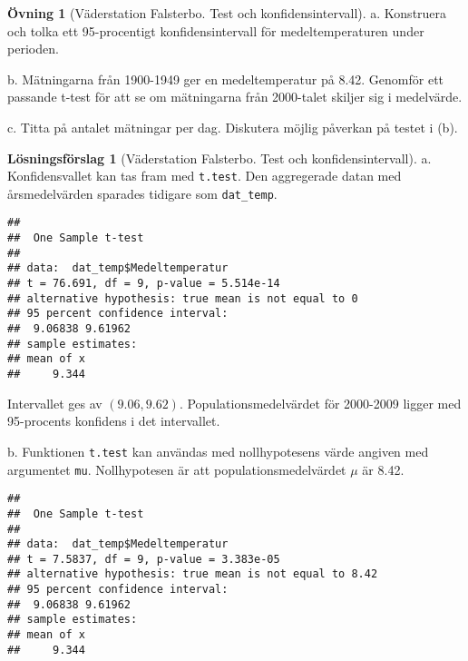 \documentclass[
]{book}
\newenvironment{Shaded}{\begin{snugshade}}{\end{snugshade}}
\newcommand{\AttributeTok}[1]{\textcolor[rgb]{0.77,0.63,0.00}{#1}}
\newcommand{\FloatTok}[1]{\textcolor[rgb]{0.00,0.00,0.81}{#1}}
\newcommand{\FunctionTok}[1]{\textcolor[rgb]{0.00,0.00,0.00}{#1}}
\newcommand{\NormalTok}[1]{#1}
\newcommand{\SpecialCharTok}[1]{\textcolor[rgb]{0.00,0.00,0.00}{#1}}
\theoremstyle{definition}
\theoremstyle{definition}
\theoremstyle{definition}
\newtheorem{exercise}{Övning}[chapter]
\theoremstyle{definition}
\newtheorem{hypothesis}{Lösningsförslag}[chapter]
\theoremstyle{remark}
\begin{document}
\begin{exercise}[Väderstation Falsterbo. Test och konfidensintervall]
a. Konstruera och tolka ett 95-procentigt konfidensintervall för medeltemperaturen under perioden.

b. Mätningarna från 1900-1949 ger en medeltemperatur på 8.42. Genomför ett passande t-test för att se om mätningarna från 2000-talet skiljer sig i medelvärde.

c. Titta på antalet mätningar per dag. Diskutera möjlig påverkan på testet i (b).
\end{exercise}

\begin{hypothesis}[Väderstation Falsterbo. Test och konfidensintervall]
a. Konfidensvallet kan tas fram med \texttt{t.test}. Den aggregerade datan med årsmedelvärden sparades tidigare som \texttt{dat\_temp}.

\begin{Shaded}
\end{Shaded}

\begin{verbatim}
## 
##  One Sample t-test
## 
## data:  dat_temp$Medeltemperatur
## t = 76.691, df = 9, p-value = 5.514e-14
## alternative hypothesis: true mean is not equal to 0
## 95 percent confidence interval:
##  9.06838 9.61962
## sample estimates:
## mean of x 
##     9.344
\end{verbatim}

Intervallet ges av \((9.06, 9.62)\). Populationsmedelvärdet för 2000-2009 ligger med 95-procents konfidens i det intervallet.

b. Funktionen \texttt{t.test} kan användas med nollhypotesens värde angiven med argumentet \texttt{mu}. Nollhypotesen är att populationsmedelvärdet \(\mu\) är 8.42.

\begin{Shaded}
\end{Shaded}

\begin{verbatim}
## 
##  One Sample t-test
## 
## data:  dat_temp$Medeltemperatur
## t = 7.5837, df = 9, p-value = 3.383e-05
## alternative hypothesis: true mean is not equal to 8.42
## 95 percent confidence interval:
##  9.06838 9.61962
## sample estimates:
## mean of x 
##     9.344
\end{verbatim}


\end{hypothesis}
\end{document}
